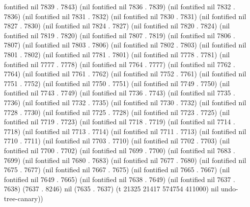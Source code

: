 fontified nil 7839 . 7843) (nil fontified nil 7836 . 7839) (nil fontified nil 7832 . 7836) (nil fontified nil 7831 . 7832) (nil fontified nil 7830 . 7831) (nil fontified nil 7827 . 7830) (nil fontified nil 7824 . 7827) (nil fontified nil 7820 . 7824) (nil fontified nil 7819 . 7820) (nil fontified nil 7807 . 7819) (nil fontified nil 7806 . 7807) (nil fontified nil 7803 . 7806) (nil fontified nil 7802 . 7803) (nil fontified nil 7801 . 7802) (nil fontified nil 7781 . 7801) (nil fontified nil 7778 . 7781) (nil fontified nil 7777 . 7778) (nil fontified nil 7764 . 7777) (nil fontified nil 7762 . 7764) (nil fontified nil 7761 . 7762) (nil fontified nil 7752 . 7761) (nil fontified nil 7751 . 7752) (nil fontified nil 7750 . 7751) (nil fontified nil 7749 . 7750) (nil fontified nil 7743 . 7749) (nil fontified nil 7736 . 7743) (nil fontified nil 7735 . 7736) (nil fontified nil 7732 . 7735) (nil fontified nil 7730 . 7732) (nil fontified nil 7728 . 7730) (nil fontified nil 7725 . 7728) (nil fontified nil 7723 . 7725) (nil fontified nil 7719 . 7723) (nil fontified nil 7718 . 7719) (nil fontified nil 7714 . 7718) (nil fontified nil 7713 . 7714) (nil fontified nil 7711 . 7713) (nil fontified nil 7710 . 7711) (nil fontified nil 7703 . 7710) (nil fontified nil 7702 . 7703) (nil fontified nil 7700 . 7702) (nil fontified nil 7699 . 7700) (nil fontified nil 7683 . 7699) (nil fontified nil 7680 . 7683) (nil fontified nil 7677 . 7680) (nil fontified nil 7675 . 7677) (nil fontified nil 7667 . 7675) (nil fontified nil 7665 . 7667) (nil fontified nil 7649 . 7665) (nil fontified nil 7638 . 7649) (nil fontified nil 7637 . 7638) (7637 . 8246) nil (7635 . 7637) (t 21325 21417 574754 411000) nil undo-tree-canary))
